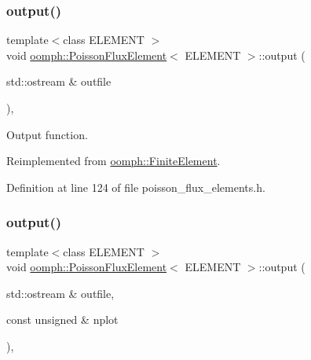 \subsubsection{\texorpdfstring{output()}{output()}\hspace{0.1cm}{\footnotesize\ttfamily [1/4]}}
{\footnotesize\ttfamily template$<$class E\+L\+E\+M\+E\+NT $>$ \\
void \hyperlink{classoomph_1_1PoissonFluxElement}{oomph\+::\+Poisson\+Flux\+Element}$<$ E\+L\+E\+M\+E\+NT $>$\+::output (\begin{DoxyParamCaption}\item[{std\+::ostream \&}]{outfile }\end{DoxyParamCaption})\hspace{0.3cm}{\ttfamily [inline]}, {\ttfamily [virtual]}}



Output function. 



Reimplemented from \hyperlink{classoomph_1_1FiniteElement_a2ad98a3d2ef4999f1bef62c0ff13f2a7}{oomph\+::\+Finite\+Element}.



Definition at line 124 of file poisson\+\_\+flux\+\_\+elements.\+h.

\mbox{\label{classoomph_1_1PoissonFluxElement_a81b328ed2127556fa9e5b948d94aca97}} 
\subsubsection{\texorpdfstring{output()}{output()}\hspace{0.1cm}{\footnotesize\ttfamily [2/4]}}
{\footnotesize\ttfamily template$<$class E\+L\+E\+M\+E\+NT $>$ \\
void \hyperlink{classoomph_1_1PoissonFluxElement}{oomph\+::\+Poisson\+Flux\+Element}$<$ E\+L\+E\+M\+E\+NT $>$\+::output (\begin{DoxyParamCaption}\item[{std\+::ostream \&}]{outfile,  }\item[{const unsigned \&}]{nplot }\end{DoxyParamCaption})\hspace{0.3cm}{\ttfamily [inline]}, {\ttfamily [virtual]}}



